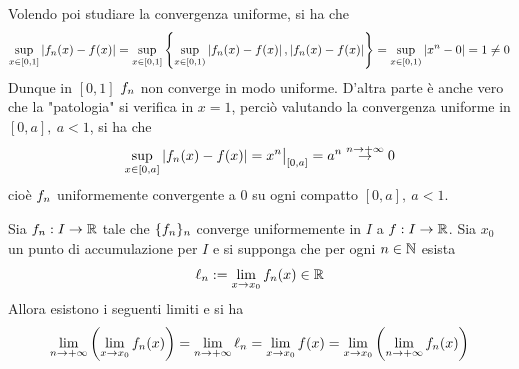 \begin{example}
\begin{figure}[H]
\begin{minipage}{0.38\textwidth}
    \end{minipage}
    \end{figure}
Volendo poi studiare la convergenza uniforme, si ha che
\begin{equation*}
    \sup_{x \in [0,1]}{\left|f_n(x)-f(x)\right|} = \sup_{x \in [0,1]} \left\{ \sup_{x \in [0,1)} \left|f_n(x)-f(x)\right|, \left|f_n(x)-f(x)\right|\right\} = \sup_{x \in [0,1)}{\left|x^n-0\right|} = 1 \neq 0
\end{equation*}
Dunque in $[0,1]$ $f_n$ non converge in modo uniforme. D'altra parte è anche vero che la "patologia" si verifica in $x=1$, perciò valutando la convergenza uniforme in $[0,a],\ a < 1$, si ha che
\begin{equation*}
    \sup_{x \in [0,a]}{|f_n(x)-f(x)|}= x^n \big|_{[0,a]} = a^n \overset{n \to +\infty}{\to} 0
\end{equation*}
cioè $f_n$ uniformemente convergente a $0$ su ogni compatto $[0,a],\ a<1$.
\end{example}
\begin{theorem} \label{Teo: Scambio di limiti}
Sia $f_n: I \to \mathbb{R}$ tale che $\{f_n\}_n$ converge uniformemente in $I$ a $f: I \to \mathbb{R}$. Sia $x_0$ un punto di accumulazione per $I$ e si supponga che per ogni $n \in \mathbb{N}$ esista
\begin{equation}
    \ell_n:= \lim_{x \to x_0}{f_n(x)} \in \mathbb{R}
\end{equation}
Allora esistono i seguenti limiti e si ha
\begin{equation}
    \lim_{n \to +\infty}{\left(\lim_{x \to x_0} {f_n(x)}\right)}= \lim_{n \to +\infty}{\ell_n} = \lim_{x \to x_0} {f(x)} = \lim_{x \to x_0}{ \left( \lim_{n \to +\infty} {f_n(x)}\right)}
\end{equation}
\end{theorem}
